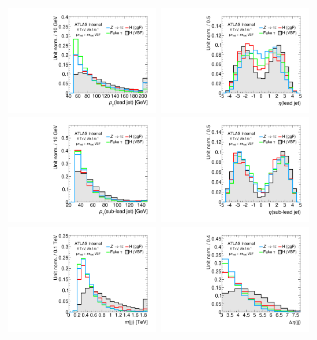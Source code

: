 \begin{figure}[tp]
  \centering
  \includegraphics[width=0.35\textwidth]{figures/overlaid/vbf/jet-1-pt}
  \includegraphics[width=0.35\textwidth]{figures/overlaid/vbf/jet-1-eta}
  \includegraphics[width=0.35\textwidth]{figures/overlaid/vbf/jet-2-pt}
  \includegraphics[width=0.35\textwidth]{figures/overlaid/vbf/jet-2-eta}
  \includegraphics[width=0.35\textwidth]{figures/overlaid/vbf/dijet-m-veryhigh}
  \includegraphics[width=0.35\textwidth]{figures/overlaid/vbf/jets-deta}

\end{figure}
